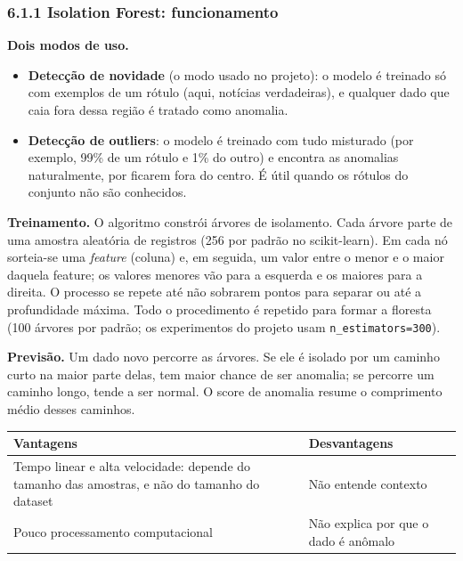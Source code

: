 \documentclass[
  brazilian,
  11pt,
]{article}
\newcounter{none} %
\providecommand{\tightlist}{%
  \setlength{\itemsep}{0pt}\setlength{\parskip}{0pt}}
\begin{document}
\subsubsection{6.1.1 Isolation Forest: funcionamento}\label{isolation-forest-funcionamento}

\textbf{Dois modos de uso.}

\begin{itemize}
\tightlist
\item
  \textbf{Detecção de novidade} (o modo usado no projeto): o modelo é treinado só com exemplos de um rótulo (aqui, notícias verdadeiras), e qualquer dado que caia fora dessa região é tratado como anomalia.
\item
  \textbf{Detecção de outliers}: o modelo é treinado com tudo misturado (por exemplo, 99\% de um rótulo e 1\% do outro) e encontra as anomalias naturalmente, por ficarem fora do centro. É útil quando os rótulos do conjunto não são conhecidos.
\end{itemize}

\textbf{Treinamento.} O algoritmo constrói árvores de isolamento. Cada árvore parte de uma amostra aleatória de registros (256 por padrão no scikit-learn). Em cada nó sorteia-se uma \emph{feature} (coluna) e, em seguida, um valor entre o menor e o maior daquela feature; os valores menores vão para a esquerda e os maiores para a direita. O processo se repete até não sobrarem pontos para separar ou até a profundidade máxima. Todo o procedimento é repetido para formar a floresta (100 árvores por padrão; os experimentos do projeto usam \texttt{n\_estimators=300}).

\textbf{Previsão.} Um dado novo percorre as árvores. Se ele é isolado por um caminho curto na maior parte delas, tem maior chance de ser anomalia; se percorre um caminho longo, tende a ser normal. O score de anomalia resume o comprimento médio desses caminhos.

{\def\LTcaptype{none} %
\begin{longtable}[]{@{}
  >{\raggedright\arraybackslash}p{}
  >{\raggedright\arraybackslash}p{}@{}}
\toprule\noalign{}
\begin{minipage}[b]{\linewidth}\raggedright
Vantagens
\end{minipage} & \begin{minipage}[b]{\linewidth}\raggedright
Desvantagens
\end{minipage} \\
\midrule\noalign{}
\endhead
\bottomrule\noalign{}
\endlastfoot
Tempo linear e alta velocidade: depende do tamanho das amostras, e não do tamanho do dataset & Não entende contexto \\
Pouco processamento computacional & Não explica por que o dado é anômalo \\
\end{longtable}
}
\end{document}
